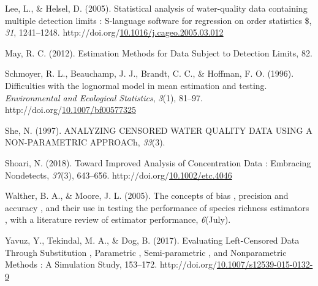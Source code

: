 \documentclass[12pt, twoside]{amherstthesis}
\newenvironment{CSLReferences}%
  {}%
  {\par}
\begin{document}
\begin{CSLReferences}{1}{0}
\leavevmode\hypertarget{ref-Lee2005}{}%
Lee, L., \& Helsel, D. (2005). {Statistical analysis of water-quality data containing multiple detection limits : S-language software for regression on order statistics {\$}}, \emph{31}, 1241--1248. http://doi.org/\href{https://doi.org/10.1016/j.cageo.2005.03.012}{10.1016/j.cageo.2005.03.012}

\leavevmode\hypertarget{ref-May2012}{}%
May, R. C. (2012). {Estimation Methods for Data Subject to Detection Limits}, 82.

\leavevmode\hypertarget{ref-Schmoyer1996}{}%
Schmoyer, R. L., Beauchamp, J. J., Brandt, C. C., \& Hoffman, F. O. (1996). {Difficulties with the lognormal model in mean estimation and testing}. \emph{Environmental and Ecological Statistics}, \emph{3}(1), 81--97. http://doi.org/\href{https://doi.org/10.1007/bf00577325}{10.1007/bf00577325}

\leavevmode\hypertarget{ref-She1997}{}%
She, N. (1997). {ANALYZING CENSORED WATER QUALITY DATA USING A NON-PARAMETRIC APPROACh}, \emph{33}(3).

\leavevmode\hypertarget{ref-Shoari2018}{}%
Shoari, N. (2018). {Toward Improved Analysis of Concentration Data : Embracing Nondetects}, \emph{37}(3), 643--656. http://doi.org/\href{https://doi.org/10.1002/etc.4046}{10.1002/etc.4046}

\leavevmode\hypertarget{ref-Walther2005}{}%
Walther, B. A., \& Moore, J. L. (2005). {The concepts of bias , precision and accuracy , and their use in testing the performance of species richness estimators , with a literature review of estimator performance}, \emph{6}(July).

\leavevmode\hypertarget{ref-Yavuz2017}{}%
Yavuz, Y., Tekindal, M. A., \& Dog, B. (2017). {Evaluating Left-Censored Data Through Substitution , Parametric , Semi-parametric , and Nonparametric Methods : A Simulation Study}, 153--172. http://doi.org/\href{https://doi.org/10.1007/s12539-015-0132-9}{10.1007/s12539-015-0132-9}

\end{CSLReferences}
\end{document}
